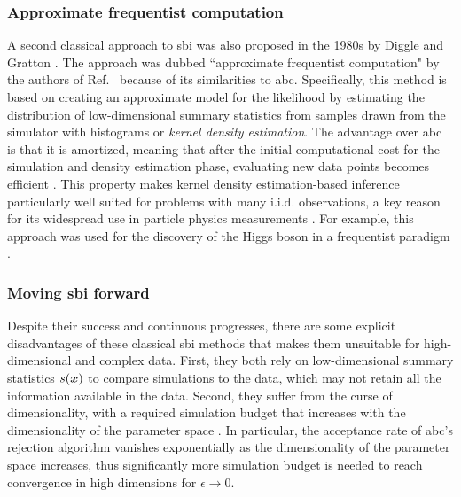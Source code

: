 \subsubsection{Approximate frequentist computation}

A second classical approach to \gls*{sbi} was also proposed in the 1980s by Diggle and Gratton \cite{diggle1984monte}. The approach was dubbed ``approximate frequentist computation" by the authors of Ref.~\cite{brehmer2018guide} because of its similarities to \gls*{abc}. Specifically, this method is based on creating an approximate model for the likelihood by estimating the distribution of low-dimensional summary statistics from samples drawn from the simulator with histograms or \emph{kernel density estimation}. The advantage over \gls*{abc} is that it is amortized, meaning that after the initial computational cost for the simulation and density estimation phase, evaluating new data points becomes efficient .
This property makes kernel density estimation-based inference particularly well suited for problems with many i.i.d. observations, a key reason for its widespread use in particle physics measurements \cite{Brehmer:2020cvb}. For example, this approach was used for the discovery of the Higgs boson in a frequentist paradigm \cite{brehmer2018guide}. 


\subsubsection{Moving \gls*{sbi} forward}

Despite their success and continuous progresses, there are some explicit disadvantages of these classical \gls*{sbi} methods that makes them unsuitable for high-dimensional and complex data. First, they both rely on low-dimensional summary statistics $s(\bm{x})$ to compare simulations to the data, which may not retain all the information available in the data. Second, they suffer from the curse of dimensionality, with a required simulation budget that increases with the dimensionality of the parameter space \cite[\eg][]{Leclercq:2018who}. In particular, the acceptance rate of \gls*{abc}'s rejection algorithm vanishes exponentially as the dimensionality of the parameter space increases, thus significantly more simulation budget is needed to reach convergence in high dimensions for $\epsilon \to 0$.

